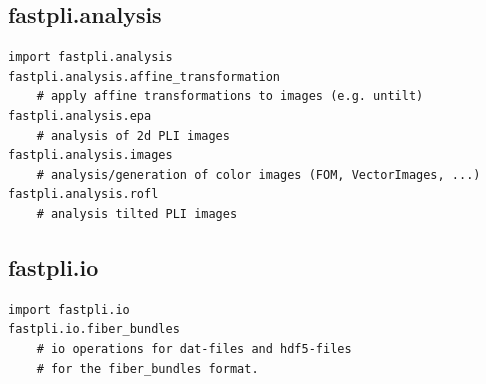 \subsection{fastpli.analysis}
\begin{lstfloat}[!ht]
\lstset{style=python}
\begin{lstlisting}
import fastpli.analysis
fastpli.analysis.affine_transformation
    # apply affine transformations to images (e.g. untilt)
fastpli.analysis.epa
    # analysis of 2d PLI images
fastpli.analysis.images
    # analysis/generation of color images (FOM, VectorImages, ...)
fastpli.analysis.rofl
    # analysis tilted PLI images
\end{lstlisting}
\caption{}
\end{lstfloat}
% 
% 
%  
\subsection{fastpli.io}
\begin{lstfloat}[!ht]
\lstset{style=python}
\begin{lstlisting}
import fastpli.io
fastpli.io.fiber_bundles
    # io operations for dat-files and hdf5-files
    # for the fiber_bundles format.
\end{lstlisting}
\caption{}\label{alg:fastpli.io}
\end{lstfloat}
% 
